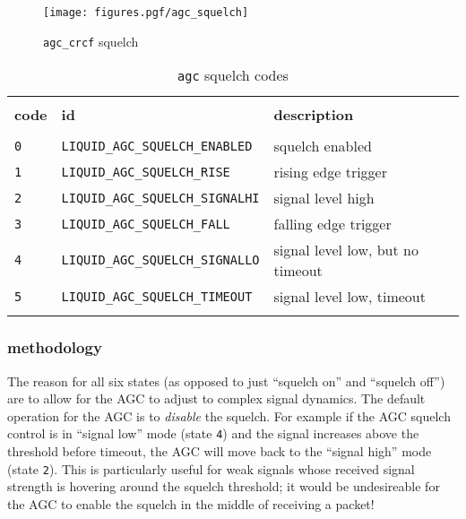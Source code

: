 \begin{figure}
\centering
  \texttt{[image: figures.pgf/agc\_squelch]}
\caption{{\tt agc\_crcf} squelch}
\label{fig:module:agc:squelch}
\end{figure}


\begin{table}[!ht]
\caption{{\tt agc} squelch codes}
\label{tab:module:agc:squelch_codes}
\centering
\begin{tabular*}{0.95\textwidth}{@{\extracolsep{\fill}}lll}

\hline\hline \\[-6pt]
{\bf code} & {\bf id} & {\bf description} \\[6pt]
\hline \\[-6pt]
{\tt 0} & {\tt LIQUID\_AGC\_SQUELCH\_ENABLED}    & squelch enabled \\
{\tt 1} & {\tt LIQUID\_AGC\_SQUELCH\_RISE}       & rising edge trigger \\
{\tt 2} & {\tt LIQUID\_AGC\_SQUELCH\_SIGNALHI}   & signal level high \\
{\tt 3} & {\tt LIQUID\_AGC\_SQUELCH\_FALL}       & falling edge trigger \\
{\tt 4} & {\tt LIQUID\_AGC\_SQUELCH\_SIGNALLO}   & signal level low, but no timeout \\
{\tt 5} & {\tt LIQUID\_AGC\_SQUELCH\_TIMEOUT}    & signal level low, timeout \\ \\[-6pt]

\hline\hline
\end{tabular*}
\end{table}%


\subsubsection{methodology}
The reason for all six states (as opposed to just ``squelch on'' and ``squelch
off'') are to allow for the AGC to adjust to complex signal dynamics.
The default operation for the AGC is to {\it disable} the squelch.
For example if the AGC squelch control is in ``signal low'' mode
(state {\tt 4}) and the signal increases above the threshold before timeout,
the AGC will move back to the ``signal high'' mode (state {\tt 2}).
This is particularly useful for weak signals whose received signal strength is
hovering around the squelch threshold; it would be undesireable for the AGC to
enable the squelch in the middle of receiving a packet!

